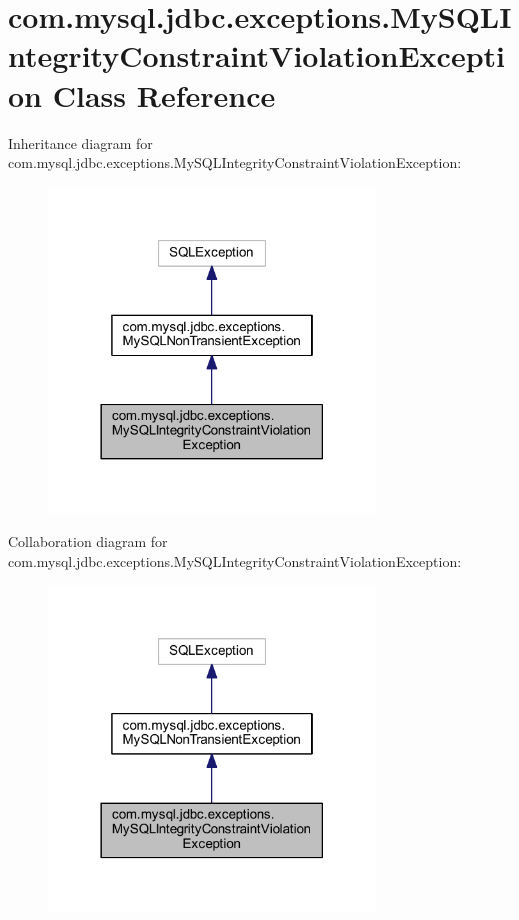 \hypertarget{classcom_1_1mysql_1_1jdbc_1_1exceptions_1_1_my_s_q_l_integrity_constraint_violation_exception}{}\section{com.\+mysql.\+jdbc.\+exceptions.\+My\+S\+Q\+L\+Integrity\+Constraint\+Violation\+Exception Class Reference}
\label{classcom_1_1mysql_1_1jdbc_1_1exceptions_1_1_my_s_q_l_integrity_constraint_violation_exception}


Inheritance diagram for com.\+mysql.\+jdbc.\+exceptions.\+My\+S\+Q\+L\+Integrity\+Constraint\+Violation\+Exception\+:
\nopagebreak
\begin{figure}[H]
\begin{center}
\leavevmode
\includegraphics[width=246pt]{classcom_1_1mysql_1_1jdbc_1_1exceptions_1_1_my_s_q_l_integrity_constraint_violation_exception__inherit__graph}
\end{center}
\end{figure}


Collaboration diagram for com.\+mysql.\+jdbc.\+exceptions.\+My\+S\+Q\+L\+Integrity\+Constraint\+Violation\+Exception\+:
\nopagebreak
\begin{figure}[H]
\begin{center}
\leavevmode
\includegraphics[width=246pt]{classcom_1_1mysql_1_1jdbc_1_1exceptions_1_1_my_s_q_l_integrity_constraint_violation_exception__coll__graph}
\end{center}
\end{figure}
